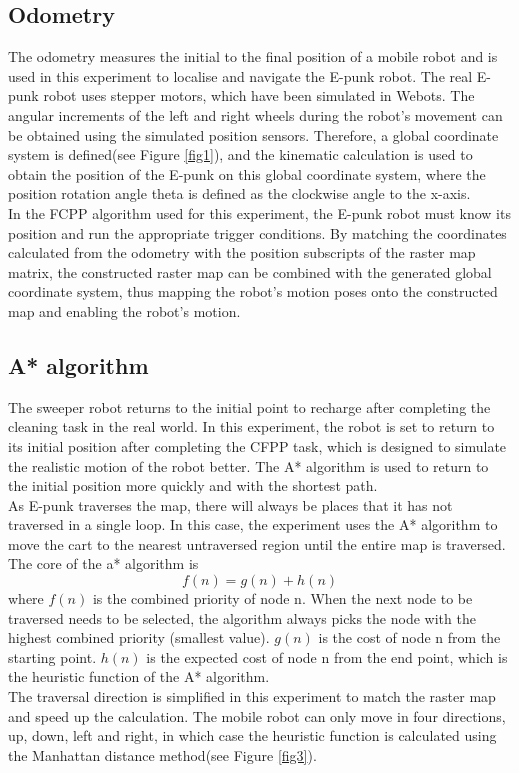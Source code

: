 \documentclass[conference]{IEEEtran}
\begin{document}
\subsection{Odometry}

The odometry measures the initial to the final position of a mobile robot and is used in this experiment to localise and navigate the E-punk robot. The real E-punk robot uses stepper motors, which have been simulated in Webots. The angular increments of the left and right wheels during the robot's movement can be obtained using the simulated position sensors. Therefore, a global coordinate system is defined(see Figure \ref{fig1}), and the kinematic calculation\cite{dudek2010computational} is used to obtain the position of the E-punk on this global coordinate system, where the position rotation angle theta is defined as the clockwise angle to the x-axis.\\
In the FCPP algorithm used for this experiment, the E-punk robot must know its position and run the appropriate trigger conditions. By matching the coordinates calculated from the odometry with the position subscripts of the raster map matrix, the constructed raster map can be combined with the generated global coordinate system, thus mapping the robot's motion poses onto the constructed map and enabling the robot's motion.

\subsection{A* algorithm}
The sweeper robot returns to the initial point to recharge after completing the cleaning task in the real world. In this experiment, the robot is set to return to its initial position after completing the CFPP task, which is designed to simulate the realistic motion of the robot better. The A* algorithm\cite{hart1968formal} is used to return to the initial position more quickly and with the shortest path.\\
As E-punk traverses the map, there will always be places that it has not traversed in a single loop. In this case, the experiment uses the A* algorithm to move the cart to the nearest untraversed region until the entire map is traversed.\\
The core of the a* algorithm is
\begin{equation}
    f(n) = g(n) + h(n)
\end{equation}
where $f(n)$ is the combined priority of node n. When the next node to be traversed needs to be selected, the algorithm always picks the node with the highest combined priority (smallest value). $g(n)$ is the cost of node n from the starting point. $h(n)$ is the expected cost of node n from the end point, which is the heuristic function of the A* algorithm.\\
The traversal direction is simplified in this experiment to match the raster map and speed up the calculation. The mobile robot can only move in four directions, up, down, left and right, in which case the heuristic function is calculated using the Manhattan distance method(see Figure \ref{fig3}).
\end{document}
